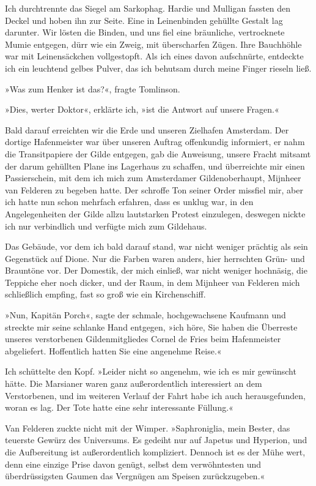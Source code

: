 Ich durchtrennte das Siegel am Sarkophag. Hardie und Mulligan
fassten den Deckel und hoben ihn zur Seite. Eine in Leinenbinden
gehüllte Gestalt lag darunter. Wir lösten die Binden, und uns fiel
eine bräunliche, vertrocknete Mumie entgegen, dürr wie ein Zweig,
mit überscharfen Zügen. Ihre Bauchhöhle war mit Leinensäckchen
vollgestopft. Als ich eines davon aufschnürte, entdeckte ich ein
leuchtend gelbes Pulver, das ich behutsam durch meine Finger
rieseln ließ.

»Was zum Henker ist das?«, fragte Tomlinson.

»Dies, werter Doktor«, erklärte ich, »ist die Antwort auf unsere
Fragen.«

Bald darauf erreichten wir die Erde und unseren Zielhafen
Amsterdam. Der dortige Hafenmeister war über unseren Auftrag
offenkundig informiert, er nahm die Transitpapiere der Gilde
entgegen, gab die Anweisung, unsere Fracht mitsamt der darum
gehüllten Plane ins Lagerhaus zu schaffen, und überreichte mir
einen Passierschein, mit dem ich mich zum Amsterdamer
Gildenoberhaupt, Mijnheer van Felderen zu begeben hatte. Der
schroffe Ton seiner Order missfiel mir, aber ich hatte nun schon
mehrfach erfahren, dass es unklug war, in den Angelegenheiten der
Gilde allzu lautstarken Protest einzulegen, deswegen nickte ich nur
verbindlich und verfügte mich zum Gildehaus.

Das Gebäude, vor dem ich bald darauf stand, war nicht weniger
prächtig als sein Gegenstück auf Dione. Nur die Farben waren
anders, hier herrschten Grün- und Brauntöne vor. Der Domestik, der
mich einließ, war nicht weniger hochnäsig, die Teppiche eher noch
dicker, und der Raum, in dem Mijnheer van Felderen mich schließlich
empfing, fast so groß wie ein Kirchenschiff.

\bigpar

»Nun, Kapitän Porch«, sagte der schmale, hochgewachsene Kaufmann
und streckte mir seine schlanke Hand entgegen, »ich höre, Sie haben
die Überreste unseres verstorbenen Gildenmitgliedes Cornel de Fries
beim Hafenmeister abgeliefert. Hoffentlich hatten Sie eine
angenehme Reise.«

Ich schüttelte den Kopf. »Leider nicht so angenehm, wie ich es mir
gewünscht hätte. Die Marsianer waren ganz außerordentlich
interessiert an dem Verstorbenen, und im weiteren Verlauf der Fahrt
habe ich auch herausgefunden, woran es lag. Der Tote hatte eine
sehr interessante Füllung.«

Van Felderen zuckte nicht mit der Wimper. »Saphroniglia, mein
Bester, das teuerste Gewürz des Universums. Es gedeiht nur auf
Japetus und Hyperion, und die Aufbereitung ist außerordentlich
kompliziert. Dennoch ist es der Mühe wert, denn eine einzige Prise
davon genügt, selbst dem verwöhntesten und überdrüssigsten Gaumen
das Vergnügen am Speisen zurückzugeben.«

